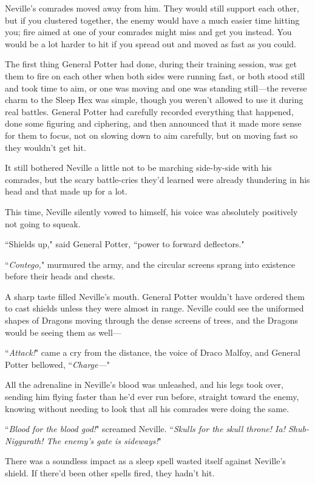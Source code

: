 Neville's comrades moved away from him. They would still support each other, but if you clustered together, the enemy would have a much easier time hitting you; fire aimed at one of your comrades might miss and get you instead. You would be a lot harder to hit if you spread out and moved as fast as you could.

The first thing General Potter had done, during their training session, was get them to fire on each other when both sides were running fast, or both stood still and took time to aim, or one was moving and one was standing still—the reverse charm to the Sleep Hex was simple, though you weren't allowed to use it during real battles. General Potter had carefully recorded everything that happened, done some figuring and ciphering, and then announced that it made more sense for them to focus, not on slowing down to aim carefully, but on moving fast so they wouldn't get hit.

It still bothered Neville a little not to be marching side-by-side with his comrades, but the scary battle-cries they'd learned were already thundering in his head and that made up for a lot.

This time, Neville silently vowed to himself, his voice was absolutely positively not going to squeak.

``Shields up," said General Potter, ``power to forward deflectors."

``\emph{Contego,}" murmured the army, and the circular screens sprang into existence before their heads and chests.

A sharp taste filled Neville's mouth. General Potter wouldn't have ordered them to cast shields unless they were almost in range. Neville could see the uniformed shapes of Dragons moving through the dense screens of trees, and the Dragons would be seeing them as well—

``\emph{Attack!}" came a cry from the distance, the voice of Draco Malfoy, and General Potter bellowed, ``\emph{Charge—}"

All the adrenaline in Neville's blood was unleashed, and his legs took over, sending him flying faster than he'd ever run before, straight toward the enemy, knowing without needing to look that all his comrades were doing the same.

``\emph{Blood for the blood god!}" screamed Neville. ``\emph{Skulls for the skull throne! Ia! Shub-Niggurath! The enemy's gate is sideways!}"

There was a soundless impact as a sleep spell wasted itself against Neville's shield. If there'd been other spells fired, they hadn't hit.

